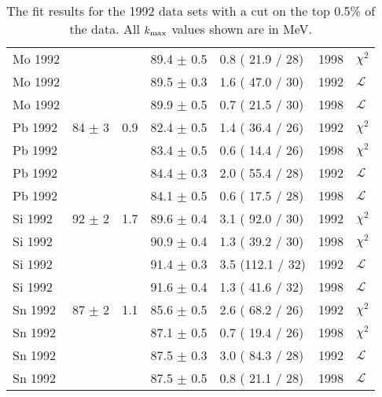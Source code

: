 \begin{table}[h]
\begin{center}
\begin{tabular}{|l||l|l|l|l|l|l|}
      Mo 1992 &                &     & 89.4 $\pm$ 0.5 & 0.8 ( 21.9 / 28) & 1998 & $\chi^2$      \\
      Mo 1992 &                &     & 89.5 $\pm$ 0.3 & 1.6 ( 47.0 / 30) & 1992 & $\mathcal{L}$ \\
      Mo 1992 &                &     & 89.9 $\pm$ 0.5 & 0.7 ( 21.5 / 30) & 1998 & $\mathcal{L}$ \\
      \hline                                                                                    
      Pb 1992 & 84   $\pm$ 3   & 0.9 & 82.4 $\pm$ 0.5 & 1.4 ( 36.4 / 26) & 1992 & $\chi^2$      \\
      Pb 1992 &                &     & 83.4 $\pm$ 0.5 & 0.6 ( 14.4 / 26) & 1998 & $\chi^2$      \\
      Pb 1992 &                &     & 84.4 $\pm$ 0.3 & 2.0 ( 55.4 / 28) & 1992 & $\mathcal{L}$ \\
      Pb 1992 &                &     & 84.1 $\pm$ 0.5 & 0.6 ( 17.5 / 28) & 1998 & $\mathcal{L}$ \\
      \hline                                                                                    
      Si 1992 & 92   $\pm$ 2   & 1.7 & 89.6 $\pm$ 0.4 & 3.1 ( 92.0 / 30) & 1992 & $\chi^2$      \\
      Si 1992 &                &     & 90.9 $\pm$ 0.4 & 1.3 ( 39.2 / 30) & 1998 & $\chi^2$      \\
      Si 1992 &                &     & 91.4 $\pm$ 0.3 & 3.5 (112.1 / 32) & 1992 & $\mathcal{L}$ \\
      Si 1992 &                &     & 91.6 $\pm$ 0.4 & 1.3 ( 41.6 / 32) & 1998 & $\mathcal{L}$ \\
      \hline                                                                                    
      Sn 1992 & 87   $\pm$ 2   & 1.1 & 85.6 $\pm$ 0.5 & 2.6 ( 68.2 / 26) & 1992 & $\chi^2$      \\
      Sn 1992 &                &     & 87.1 $\pm$ 0.5 & 0.7 ( 19.4 / 26) & 1998 & $\chi^2$      \\
      Sn 1992 &                &     & 87.5 $\pm$ 0.3 & 3.0 ( 84.3 / 28) & 1992 & $\mathcal{L}$ \\
      Sn 1992 &                &     & 87.5 $\pm$ 0.5 & 0.8 ( 21.1 / 28) & 1998 & $\mathcal{L}$ \\
      \hline


    \end{tabular}
  \end{center}
  \caption{The fit results for the 1992 data sets with a cut on the top 0.5\% of the data. All $\mbox{$k_{\rm max}$}$ values shown are in MeV.}
  \label{table:fits1992}
\end{table}

